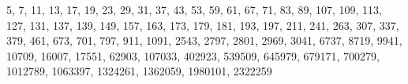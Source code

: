 5, 7, 11, 13, 17, 19, 23, 29, 31, 37, 43, 53, 59, 61, 67, 71, 83, 89, 107, 109, 113, 127, 131, 137, 139, 149, 157, 163, 173, 179, 181, 193, 197, 211, 241, 263, 307, 337, 379, 461, 673, 701, 797, 911, 1091, 2543, 2797, 2801, 2969, 3041, 6737, 8719, 9941, 10709, 16007, 17551, 62903, 107033, 402923, 539509, 645979, 679171, 700279, 1012789, 1063397, 1324261, 1362059, 1980101, 2322259